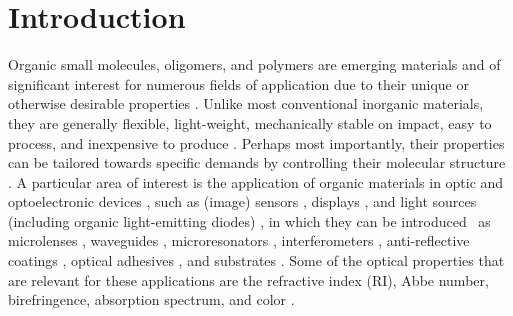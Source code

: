 \section{Introduction}
Organic small molecules, oligomers, and polymers are emerging materials and of significant interest for numerous fields of application due to their unique or otherwise desirable properties \cite{Higashihara2015}. Unlike most conventional inorganic materials, they are generally flexible, light-weight, mechanically stable on impact, easy to process, and inexpensive to produce \cite{Lu2005,Zimmermann1993}. Perhaps most importantly, their properties can be tailored towards specific demands by controlling their molecular structure \cite{Liu2009}.
A particular area of interest is the application of organic materials in optic and optoelectronic devices \cite{Lei2014}, such as (image) sensors \cite{Angione2011, Voigt2011}, displays \cite{Ummartyotin2012}, and light sources (including organic light-emitting diodes) \cite{Xiang2017}, in which they can be introduced \insitu\  as microlenses \cite{Nishiyama2009}, waveguides \cite{Kokubun1993}, microresonators \cite{Wei2016}, interferometers \cite{Rodriguez2001}, anti-reflective coatings \cite{Singaravalu2013}, optical adhesives \cite{Kim2013}, and substrates  \cite{Kim2015}. Some of the optical properties that are relevant for these applications are the refractive index (RI), Abbe number, birefringence, absorption spectrum, and color \cite{Sun2008}.   

